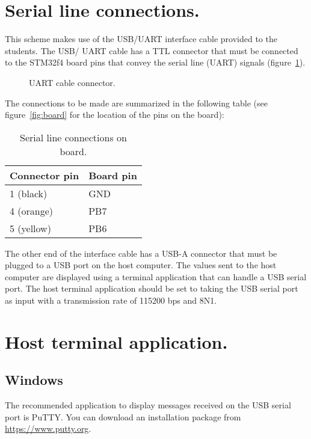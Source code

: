 \section{Serial line connections.}

This scheme makes use of the USB/UART interface cable provided to the students. The USB/ UART cable has a TTL connector that must be connected to the STM32f4 board pins that convey the serial line (UART) signals (figure~\ref{fig:cable}).

\begin{figure}[h]
            \caption{UART cable connector.}
            \label{fig:cable}
\end{figure}

The connections to be made are summarized in the following table (see figure~\ref{fig:board} for the location of the pins on the board):

\begin{table}[htb]
\begin{center}
\begin{tabular}{ll} \hline
Connector pin & Board pin \\ \hline
1 (black) & GND \\
4 (orange) & PB7 \\
5 (yellow) & PB6 \\ \hline
\end{tabular}
\caption{Serial line connections on board.}
\label{tb:connections}
\end{center}
\end{table}

The other end of the interface cable has a USB-A connector that must be plugged to a USB port on the host computer. The values sent to the host computer are displayed using a terminal application that can handle a USB serial port. The host terminal application should be set to taking the USB serial port as input with a transmission rate of 115200 bps and 8N1.

\section{Host terminal application.}\label{sc:term}
\subsection{Windows}

The recommended application to display messages received on the USB serial port is PuTTY. You can download an installation package from \url{https://www.putty.org}.

